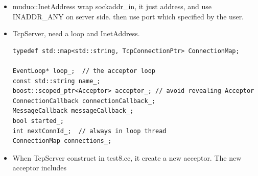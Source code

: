 \documentclass[a4paper,11pt,twoside]{book}
\begin{document}
\begin{itemize}
	\item muduo::InetAddress wrap sockaddr\_in, it just address, and use INADDR\_ANY on server side. then use port which specified by the user. 
	
	\item TcpServer, need a loop and InetAddress.
\begin{lstlisting}[numbers=none]
typedef std::map<std::string, TcpConnectionPtr> ConnectionMap;

EventLoop* loop_;  // the acceptor loop
const std::string name_;
boost::scoped_ptr<Acceptor> acceptor_; // avoid revealing Acceptor
ConnectionCallback connectionCallback_;
MessageCallback messageCallback_;
bool started_;
int nextConnId_;  // always in loop thread
ConnectionMap connections_;
\end{lstlisting}
	
	\item When TcpServer construct in test8.cc, it create a new acceptor. The new acceptor includes 	
\end{itemize}
\end{document}
